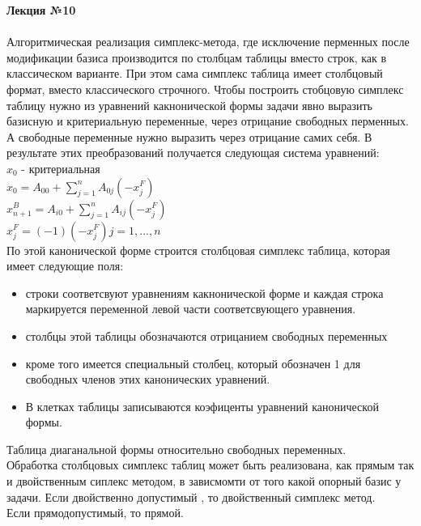 

\LARGE{ \textbf {Лекция №10}}\\
\Large{ \textbf {}}\\
Алгоритмическая реализация симплекс-метода,
где исключение перменных после модификации базиса производится по столбцам таблицы вместо строк, как в классическом варианте.
При этом сама симплекс таблица имеет столбцовый формат, вместо классического строчного.
Чтобы построить стобцовую симплекс таблицу нужно из уравнений какнонической формы задачи
явно выразить базисную и критериальную переменные, через отрицание свободных перменных.
А свободные переменные нужно выразить через отрицание самих себя. В результате этих преобразований получается
следующая система уравнений: \\

$x_0$ - критериальная\\

$x_0 = A_{00} + \sum \limits^n_{j = 1} A_{0j}(-x_j^F) $ \\
$x_{n+1}^B = A_{i0} + \sum \limits^n_{j = 1} A_{ij}(-x_j^F) $ \\
$ x_j^F = (-1) (-x^F_j ) j = 1,...,n $ \\

По этой канонической форме строится столбцовая симплекс таблица,
которая имеет следующие поля:\\
\begin{itemize}
  \item строки соответсвуют уравнениям какнонической форме и каждая строка маркируется переменной левой части соответсвующего уравнения.
  \item столбцы этой таблицы обозначаются отрицанием свободных переменных
  \item кроме того имеется специальный столбец, который обозначен 1 для свободных членов этих канонических уравнений.
  \item В клетках таблицы записываются коэфиценты уравнений канонической формы.\\
\end{itemize}


Таблица диаганальной формы относительно свободных переменных.\\
Обработка столбцовых симплекс таблиц может быть реализована, как прямым так и двойственным сиплекс методом,
в зависмомти от того какой опорный базис у задачи.
Если двойственно допустимый , то двойственный симплекс метод.\\
Если прямодопустимый, то прямой.\\

